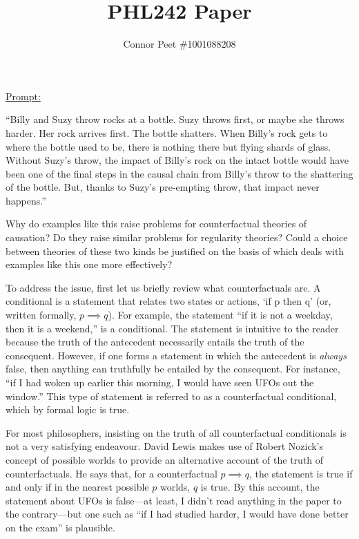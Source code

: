 \documentclass{article}
\title{PHL242 Paper}
\author{Connor Peet \#1001088208}
\affil{Professor: Imogen Dickie}
\begin{document}
\maketitle

\underline{Prompt:}
\begin{displayquote}
``Billy and Suzy throw rocks at a bottle. Suzy throws first, or maybe she throws harder. Her rock arrives first. The bottle shatters. When Billy's rock gets to where the bottle used to be, there is nothing there but flying shards of glass. Without Suzy's throw, the impact of Billy's rock on the intact bottle would have been one of the final steps in the causal chain from Billy's throw to the shattering of the bottle. But, thanks to Suzy's pre-empting throw, that impact never happens.''

Why do examples like this raise problems for counterfactual theories of causation? Do they raise similar problems for regularity theories? Could a choice between theories of these two kinds be justified on the basis of which deals with examples like this one more effectively?
\end{displayquote}

To address the issue, first let us briefly review what counterfactuals are. A conditional is a statement that relates two states or actions, `if p then q' (or, written formally, $p \implies q$). For example, the statement ``if it is not a weekday, then it is a weekend,'' is a conditional. The statement is intuitive to the reader because the truth of the antecedent necessarily entails the truth of the consequent. However, if one forms a statement in which the antecedent is \textit{always} false, then anything can truthfully be entailed by the consequent. For instance, ``if I had woken up earlier this morning, I would have seen UFOs out the window.'' This type of statement is referred to as a counterfactual conditional, which by formal logic is true.

For most philosophers, insisting on the truth of all counterfactual conditionals is not a very satisfying endeavour. David Lewis makes use of Robert Nozick's concept of possible worlds to provide an alternative account of the truth of counterfactuals. He says that, for a counterfactual $p \implies q$, the statement is true if and only if in the nearest possible $p$ worlds, $q$ is true. By this account, the statement about UFOs is false---at least, I didn't read anything in the paper to the contrary---but one such as ``if I had studied harder, I would have done better on the exam'' is plausible.
\end{document}
